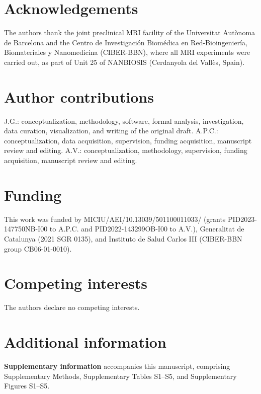 \documentclass{article}
\begin{document}
\section*{Acknowledgements}
The authors thank the joint preclinical MRI facility of the Universitat Autònoma de Barcelona and the Centro de Investigación Biomédica en Red-Bioingeniería, Biomateriales y Nanomedicina (CIBER-BBN), where all MRI experiments were carried out, as part of Unit 25 of NANBIOSIS (Cerdanyola del Vallès, Spain).

\section*{Author contributions}
J.G.: conceptualization, methodology, software, formal analysis, investigation, data curation, visualization, and writing of the original draft.\newline
A.P.C.: conceptualization, data acquisition, supervision, funding acquisition, manuscript review and editing.\newline
A.V.: conceptualization, methodology, supervision, funding acquisition, manuscript review and editing.

\section*{Funding}
This work was funded by MICIU/AEI/10.13039/501100011033/ (grants PID2023-147750NB-I00 to A.P.C. and PID2022-143299OB-I00 to A.V.), Generalitat de Catalunya (2021 SGR 0135), and Instituto de Salud Carlos III (CIBER-BBN group CB06-01-0010).

\section*{Competing interests}
The authors declare no competing interests.

\section*{Additional information}
\textbf{Supplementary information} accompanies this manuscript, comprising Supplementary Methods, Supplementary Tables S1--S5, and Supplementary Figures S1--S5.



\end{document}
